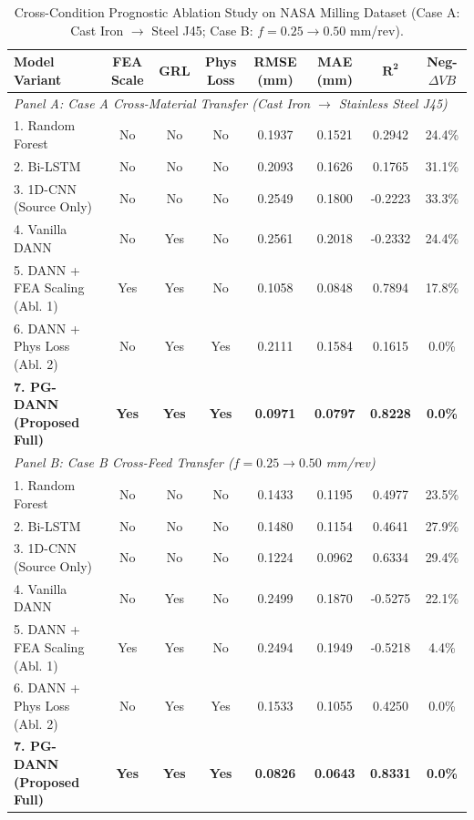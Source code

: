 \begin{table}[htbp]
\centering
\caption{Cross-Condition Prognostic Ablation Study on NASA Milling Dataset (Case A: Cast Iron $\rightarrow$ Steel J45; Case B: $f=0.25 \rightarrow 0.50$ mm/rev).}
\label{tab:ablation}
\begin{tabular}{lccccccc}
\hline
\textbf{Model Variant} & \textbf{FEA Scale} & \textbf{GRL} & \textbf{Phys Loss} & \textbf{RMSE (mm)} & \textbf{MAE (mm)} & $\mathbf{R^2}$ & \textbf{Neg-$\Delta VB$} \\
\hline
\multicolumn{8}{l}{\textit{Panel A: Case A Cross-Material Transfer (Cast Iron $\rightarrow$ Stainless Steel J45)}} \\
1. Random Forest & No & No & No & 0.1937 & 0.1521 & 0.2942 & 24.4\% \\
2. Bi-LSTM & No & No & No & 0.2093 & 0.1626 & 0.1765 & 31.1\% \\
3. 1D-CNN (Source Only) & No & No & No & 0.2549 & 0.1800 & -0.2223 & 33.3\% \\
4. Vanilla DANN & No & Yes & No & 0.2561 & 0.2018 & -0.2332 & 24.4\% \\
5. DANN + FEA Scaling (Abl. 1) & Yes & Yes & No & 0.1058 & 0.0848 & 0.7894 & 17.8\% \\
6. DANN + Phys Loss (Abl. 2) & No & Yes & Yes & 0.2111 & 0.1584 & 0.1615 & 0.0\% \\
\textbf{7. PG-DANN (Proposed Full)} & \textbf{Yes} & \textbf{Yes} & \textbf{Yes} & \textbf{0.0971} & \textbf{0.0797} & \textbf{0.8228} & \textbf{0.0\%} \\
\hline
\multicolumn{8}{l}{\textit{Panel B: Case B Cross-Feed Transfer ($f = 0.25 \rightarrow 0.50$ mm/rev)}} \\
1. Random Forest & No & No & No & 0.1433 & 0.1195 & 0.4977 & 23.5\% \\
2. Bi-LSTM & No & No & No & 0.1480 & 0.1154 & 0.4641 & 27.9\% \\
3. 1D-CNN (Source Only) & No & No & No & 0.1224 & 0.0962 & 0.6334 & 29.4\% \\
4. Vanilla DANN & No & Yes & No & 0.2499 & 0.1870 & -0.5275 & 22.1\% \\
5. DANN + FEA Scaling (Abl. 1) & Yes & Yes & No & 0.2494 & 0.1949 & -0.5218 & 4.4\% \\
6. DANN + Phys Loss (Abl. 2) & No & Yes & Yes & 0.1533 & 0.1055 & 0.4250 & 0.0\% \\
\textbf{7. PG-DANN (Proposed Full)} & \textbf{Yes} & \textbf{Yes} & \textbf{Yes} & \textbf{0.0826} & \textbf{0.0643} & \textbf{0.8331} & \textbf{0.0\%} \\
\hline
\end{tabular}
\end{table}
